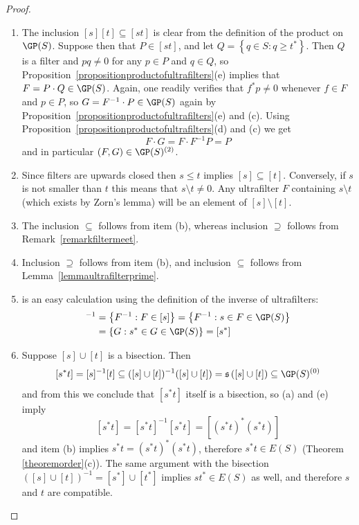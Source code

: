 \begin{proof}
\begin{enumerate}
\item[(a)] The inclusion $[s][t]\subseteq[st]$ is clear from the definition of the product on $\GP(S)$. Suppose then that $P\in [st]$, and let $Q=\left\{q\in S:q\geq t^*\right\}$. Then $Q$ is a filter and $pq\neq 0$ for any $p\in P$ and $q\in Q$, so Proposition~\ref{propositionproductofultrafilters}(e) implies that $F=P\cdot Q\in\GP(S)$. Again, one readily verifies that $f^*p\neq 0$ whenever $f\in F$ and $p\in P$, so $G=F^{-1}\cdot P\in\GP(S)$ again by Proposition~\ref{propositionproductofultrafilters}(e) and (c). Using Proposition~\ref{propositionproductofultrafilters}(d) and (c) we get
\[F\cdot G=F\cdot F^{-1}P=P\]
and in particular $(F,G)\in\GP(S)^{(2)}$.
\item[(b)] Since filters are upwards closed then $s\leq t$ implies $[s]\subseteq[t]$. Conversely, if $s$ is not smaller than $t$ this means that $s\setminus t\neq 0$. Any ultrafilter $F$ containing $s\setminus t$ (which exists by Zorn's lemma) will be an element of $[s]\setminus[t]$.
\item[(c)] The inclusion $\subseteq$ follows from item (b), whereas inclusion $\supseteq$ follows from Remark~\ref{remarkfiltermeet}.
\item[(d)] Inclusion $\supseteq$ follows from item (b), and inclusion $\subseteq$ follows from Lemma~\ref{lemmaultrafilterprime}.
\item[(e)] is an easy calculation using the definition of the inverse of ultrafilters:
\begin{align*}
[s]^{-1}&=\left\{F^{-1}:F\in[s]\right\}=\left\{F^{-1}:s\in F\in\GP(S)\right\}\\
&=\left\{G:s^*\in G\in\GP(S)\right\}=[s^*]
\end{align*}
\item[(f)] Suppose $[s]\cup [t]$ is a bisection. Then
\[[s^*t]=[s]^{-1}[t]\subseteq([s]\cup[t])^{-1}([s]\cup[t])=\mathfrak{s}\left([s]\cup[t]\right)\subseteq\GP(S)^{(0)}\]
and from this we conclude that $[s^*t]$ itself is a bisection, so (a) and (e) imply
\[[s^*t]=[s^*t]^{-1}[s^*t]=[(s^*t)^*(s^*t)]\]
and item (b) implies $s^*t=(s^*t)^*(s^*t)$, therefore $s^*t\in E(S)$ (Theorem \ref{theoremorder}(c)). The same argument with the bisection $([s]\cup[t])^{-1}=[s^*]\cup[t^*]$ implies $st^*\in E(S)$ as well, and therefore $s$ and $t$ are compatible.\qedhere
\end{enumerate}
\end{proof}

